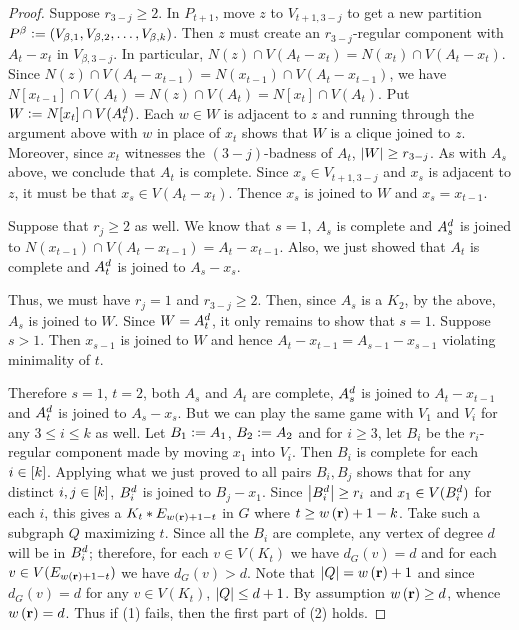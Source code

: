 \begin{proof}
			Suppose $r_{3-j} \geq 2$.  In $P_{t+1}$, move $z$ to $V_{t+1, 3-j}$ to
			get a new partition $P^{\beta} \mathrel{\mathop:}= (V_{\beta, 1},
			V_{\beta, 2}, \ldots, V_{\beta, k})$. Then $z$ must create an
			$r_{3-j}$-regular component with $A_t - x_t$ in $V_{\beta, 3-j}$.  In
			particular, $N(z) \cap V(A_t - x_t) = N(x_t) \cap V(A_t - x_t)$.  Since $N(z)
			\cap V(A_t - x_{t-1}) = N(x_{t-1}) \cap V(A_t - x_{t-1})$, we have
			$N[x_{t-1}] \cap V(A_t) = N(z) \cap V(A_t) = N[x_t] \cap V(A_t)$.  Put $W
			\mathrel{\mathop:}= N[x_t] \cap V(A_t^{d})$. Each $w \in W$ is adjacent to $z$
			and running through the argument above with $w$ in place of $x_t$ shows
			that $W$ is a clique joined to $z$.  Moreover, since $x_t$ witnesses the
			$(3-j)$-badness of $A_t$, $\left|W\right| \geq r_{3-j}$.  As with $A_s$ above, we
			conclude that $A_t$ is complete.  Since $x_s \in V_{t+1, 3-j}$ and $x_s$ is
			adjacent to $z$, it must be that $x_s \in V(A_t - x_t)$.  Thence $x_s$ is
			joined to $W$ and $x_s = x_{t-1}$.  
			
			Suppose that $r_j \geq 2$ as well.  We know that $s = 1$, $A_s$ is
			complete and $A_s^{d}$ is joined to $N(x_{t-1}) \cap V(A_t - x_{t-1})
			= A_t - x_{t-1}$.  Also, we just showed that $A_t$ is complete and
			$A_t^{d}$ is joined to $A_s - x_s$.
						
			Thus, we must have $r_j = 1$ and $r_{3-j} \geq 2$.  Then,
			since $A_s$ is a $K_2$, by the above, $A_s$ is joined to $W$.  Since $W =
			A_t^{d}$, it only remains to show that $s=1$. Suppose $s > 1$.  Then
			$x_{s-1}$ is joined to $W$ and hence $A_t - x_{t-1} = A_{s - 1} - x_{s-1}$ violating minimality of $t$.
			
			Therefore $s = 1$, $t = 2$, both $A_s$ and $A_t$ are complete,
			$A_s^{d}$ is joined to $A_t - x_{t-1}$ and $A_t^{d}$ is joined to
			$A_s - x_s$.  But we can play the same game with $V_1$ and $V_i$ for any
			$3 \leq i \leq k$ as well.  Let $B_1 \mathrel{\mathop:}= A_1$, $B_2 \mathrel{\mathop:}= A_2$
			and for $i \geq 3$, let $B_i$ be the $r_i$-regular component made by moving
			$x_1$ into $V_i$.  Then $B_i$ is complete for each $i \in \left[k\right]$. 
			Applying what we just proved to all pairs $B_i, B_j$ shows that for any
			distinct $i, j \in \left[k\right]$, $B_i^{d}$ is joined to $B_j - x_1$. 
			Since $\left|B_i^{d}\right| \geq r_i$ and $x_1 \in V(B_i^{d})$ for each
			$i$, this gives a $K_t \mbox{\hspace{2 pt}$\ast$\hspace{2 pt}} E_{w\left( \mathbf{r} \right) + 1 - t}$ in $G$ where $t \geq w\left( \mathbf{r} \right) + 1 -
			k$.  Take such a subgraph $Q$ maximizing $t$.  Since all the $B_i$ are
			complete, any vertex of degree $d$ will be in $B_i^{d}$; therefore, for each $v
			\in V(K_t)$ we have $d_G(v) = d$ and for each $v \in V(E_{w\left( \mathbf{r} \right)+1-t})$ we have $d_G(v) > d$.
			Note that $\left|Q\right| = w\left( \mathbf{r} \right)+1$ and since $d_G(v) = d$ for any $v \in V(K_t)$,
			$\left|Q\right| \leq d + 1$. By assumption $w\left( \mathbf{r} \right) \geq d$, whence $w\left( \mathbf{r} \right)=d$.  
			Thus if (1) fails, then	the first part of (2) holds.
			

\end{proof}

